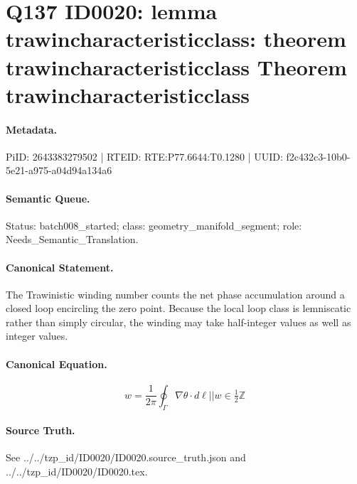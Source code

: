 \section*{Q137 ID0020: lemma trawincharacteristicclass: theorem trawincharacteristicclass Theorem trawincharacteristicclass}
\paragraph{Metadata.}
PiID: 2643383279502 | RTEID: RTE:P77.6644:T0.1280 | UUID: f2c432c3-10b0-5e21-a975-a04d94a134a6

\paragraph{Semantic Queue.}
Status: batch008\_started; class: geometry\_manifold\_segment; role: Needs\_Semantic\_Translation.

\paragraph{Canonical Statement.}
The Trawinistic winding number counts the net phase accumulation around a closed loop encircling the zero point. Because the local loop class is lemniscatic rather than simply circular, the winding may take half-integer values as well as integer values.

\paragraph{Canonical Equation.}
\[
w = \frac{1}{2\pi} \oint_{\Gamma} \nabla \theta \cdot d\ell || w \in \tfrac{1}{2}\mathbb{Z}
\]

\paragraph{Source Truth.}
See ../../tzp\_id/ID0020/ID0020.source\_truth.json and ../../tzp\_id/ID0020/ID0020.tex.

